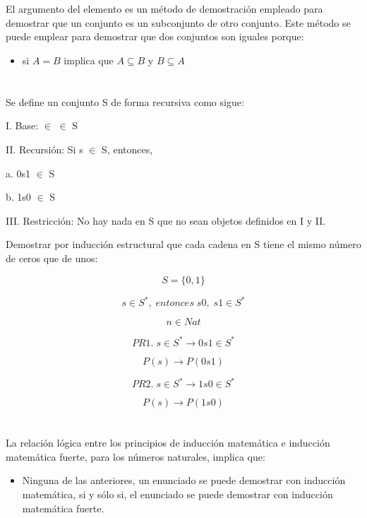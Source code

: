 \documentclass[12pt, letterpaper, twoside]{article}
\begin{document}
    \section{}

    El argumento del elemento es un método de demostración empleado para demostrar que un conjunto
    es un subconjunto de otro conjunto. Este método se puede emplear para demostrar que dos conjuntos son iguales porque:

    \begin{itemize}
        \item si $ A = B $ implica que $ A \subseteq B $ y $ B \subseteq A $
    \end{itemize}

    \section{}

    Se define un conjunto S de forma recursiva como sigue:
    
    I. Base: $\in$ $\in$ S
    
    II. Recursión: Si s $\in$ S, entonces,
    
    a. 0s1 $\in$ S
    
    b. 1s0 $\in$ S
    
    III. Restricción: No hay nada en S que no sean objetos definidos en I y II.

    Demostrar por inducción estructural que cada cadena en S tiene el mismo número de ceros que de unos:

    \[ S = \{0, 1\}\]

    \[s \in S^*,\; entonces\; s0,\; s1 \in S^*\]

    \[n \in Nat\]

    \[PR1.\; s \in S^* \rightarrow 0s1 \in S^*\]

    \[P(s) \rightarrow P(0s1)\]

    \[PR2.\; s \in S^* \rightarrow 1s0 \in S^*\]

    \[P(s) \rightarrow P(1s0)\]

    \section{}

    La relación lógica entre los principios de inducción matemática e inducción matemática fuerte, 
    para los números naturales, implica que:

    \begin{itemize}
        \item Ninguna de las anteriores, un enunciado se puede demostrar con inducción matemática, si y sólo si, 
        el enunciado se puede demostrar con inducción matemática fuerte.
    \end{itemize}
\end{document}
